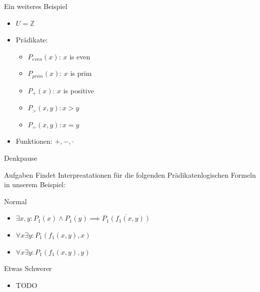 \begin{frame}{Ein weiteres Beispiel}
    \begin{itemize}
        \item $U = \mathbb Z$
        \item Prädikate:
        \begin{itemize}
            \item $P_{even}(x)$: $x$ is even
            \item $P_{prim}(x)$: $x$ is prim
            \item $P_{+}(x)$: $x$ is positive
            \item $P_>(x,y): x>y$ 
            \item $P_=(x,y): x=y$ 
        \end{itemize}
        \item Funktionen: $+, -, \cdot$ 
    \end{itemize}
\end{frame}

{
\begin{frame}[fragile]{Denkpause}
    \footnotesize
        \begin{alertblock}{Aufgaben}
            Findet Interpreatationen für die folgenden Prädikatenlogischen Formeln in unserem Beispiel:
        \end{alertblock}
        \begin{block}{Normal}
            \begin{itemize}
                \item $\exists x,y : P_1(x) \wedge P_1(y) \implies \overline{P_1(f_1(x,y))}$
                \item $\forall x\exists y: P_1(f_1(x,y),x)$
                \item $\forall x\exists y: P_1(f_1(x,y),y)$
            \end{itemize}
        \end{block}
        \begin{block}{Etwas Schwerer}
            \begin{itemize}
                \item TODO
            \end{itemize}
        \end{block}
\end{frame}
}